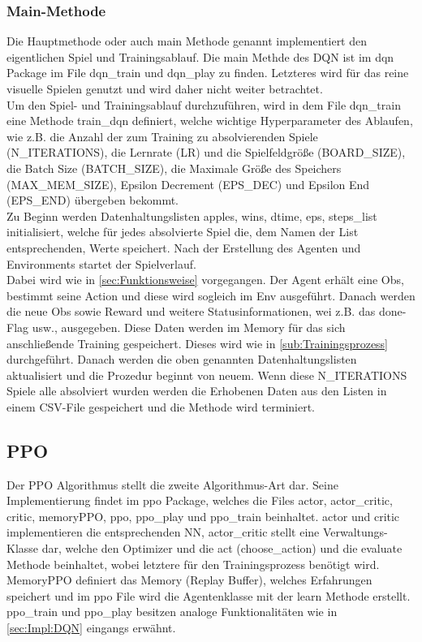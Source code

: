 \subsubsection{Main-Methode} \label{sec:Impl:Main_Methode}
Die Hauptmethode oder auch main Methode genannt implementiert den eigentlichen Spiel und Trainingsablauf. Die main Methde des DQN ist im dqn Package im File dqn\_train und dqn\_play zu finden. Letzteres wird für das reine visuelle Spielen genutzt und wird daher nicht weiter betrachtet.\\
Um den Spiel- und Trainingsablauf durchzuführen, wird in dem File dqn\_train eine Methode train\_dqn definiert, welche wichtige Hyperparameter des Ablaufen, wie z.B. die Anzahl der zum Training zu absolvierenden Spiele (N\_ITERATIONS), die Lernrate (LR) und die Spielfeldgröße (BOARD\_SIZE), die Batch Size (BATCH\_SIZE), die Maximale Größe des Speichers (MAX\_MEM\_SIZE), Epsilon Decrement (EPS\_DEC) und Epsilon End (EPS\_END) übergeben bekommt.\\
Zu Beginn werden Datenhaltungslisten apples, wins, dtime, eps, steps\_list initialisiert, welche für jedes absolvierte Spiel die, dem Namen der List entsprechenden, Werte speichert. Nach der Erstellung des Agenten und Environments startet der Spielverlauf.\\
Dabei wird wie in \ref{sec:Funktionsweise} vorgegangen. Der Agent erhält eine Obs, bestimmt seine Action und diese wird sogleich im Env ausgeführt. Danach werden die neue Obs sowie Reward und weitere Statusinformationen, wei z.B. das done-Flag usw., ausgegeben. Diese Daten werden im Memory für das sich anschließende Training gespeichert. Dieses wird wie in \ref{sub:Trainingsprozess} durchgeführt. Danach werden die oben genannten Datenhaltungslisten aktualisiert und die Prozedur beginnt von neuem. Wenn diese N\_ITERATIONS Spiele alle absolviert wurden werden die Erhobenen Daten aus den Listen in einem CSV-File gespeichert und die Methode wird terminiert. 

\subsection{PPO}
Der PPO Algorithmus stellt die zweite Algorithmus-Art dar. Seine Implementierung findet im ppo Package, welches die Files actor, actor\_critic, critic, memoryPPO, ppo, ppo\_play und ppo\_train beinhaltet. actor und critic implementieren die entsprechenden NN, actor\_critic stellt eine Verwaltungs-Klasse dar, welche den Optimizer und die act (choose\_action) und die evaluate Methode beinhaltet, wobei letztere für den Trainingsprozess benötigt wird. MemoryPPO definiert das Memory (Replay Buffer), welches Erfahrungen speichert und im ppo File wird die Agentenklasse mit der learn Methode erstellt. ppo\_train und ppo\_play besitzen analoge Funktionalitäten wie in \ref{sec:Impl:DQN} eingangs erwähnt.

